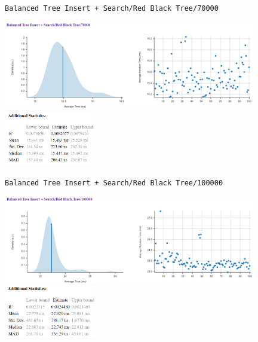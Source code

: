 \documentclass[11pt, letterpaper]{article}
\begin{document}
\texttt{Balanced Tree Insert + Search/Red Black Tree/70000}
\begin{paracol}{3}
    \centering        
    \includegraphics[width=11cm]{benchmarks/Red_black_tree/70000/plots.png}
    \switchcolumn
    \vspace*{\fill}
    \includegraphics[width=4cm]{benchmarks/Red_black_tree/70000/stats.png}
    \vspace*{\fill}
\end{paracol}

\newpage
\texttt{Balanced Tree Insert + Search/Red Black Tree/100000}
\begin{paracol}{3}
    \centering        
    \includegraphics[width=11cm]{benchmarks/Red_black_tree/100000/plots.png}
    \switchcolumn
    \vspace*{\fill}
    \includegraphics[width=4cm]{benchmarks/Red_black_tree/100000/stats.png}
    \vspace*{\fill}
\end{paracol}
\end{document}
